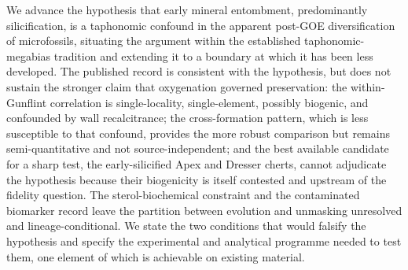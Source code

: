\documentclass[11pt]{article}
\begin{document}
We advance the hypothesis that early mineral entombment, predominantly silicification, is a
taphonomic confound in the apparent post-GOE diversification of microfossils, situating the argument
within the established taphonomic-megabias tradition and extending it to a boundary at which it has
been less developed. The published record is consistent with the hypothesis, but does not sustain the
stronger claim that oxygenation governed preservation: the within-Gunflint correlation is
single-locality, single-element, possibly biogenic, and confounded by wall recalcitrance; the
cross-formation pattern, which is less susceptible to that confound, provides the more robust comparison but
remains semi-quantitative and not source-independent; and the best available candidate for a sharp
test, the early-silicified Apex and Dresser cherts, cannot adjudicate the hypothesis because their
biogenicity is itself contested and upstream of the fidelity question. The sterol-biochemical
constraint and the contaminated biomarker record leave the partition between evolution and unmasking
unresolved and lineage-conditional. We state the two conditions that would falsify the hypothesis
and specify the experimental and analytical programme needed to test them, one element of which is
achievable on existing material.
\end{document}
